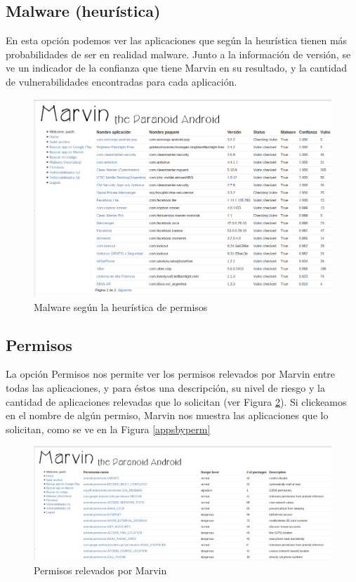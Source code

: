 \documentclass[11pt]{article}
\begin{document}
\subsection{Malware (heurística)}
En esta opción podemos ver las aplicaciones que según la heurística tienen más probabilidades de ser en realidad malware. Junto a la información de versión, se ve un indicador de la confianza que tiene Marvin en su resultado, y la cantidad de vulnerabilidades encontradas para cada aplicación.
\begin{figure}[H]
\begin{center}
\includegraphics[width=\textwidth]{graphics/marvin_bayesboys.png}
\caption{Malware según la heurística de permisos} \label{bayes}
\end{center}
\end{figure}
\subsection{Permisos}\label{permisos}
La opción Permisos nos permite ver los permisos relevados por Marvin entre todas las aplicaciones, y para éstos una descripción, su nivel de riesgo y la cantidad de aplicaciones relevadas que lo solicitan (ver Figura \ref{perms}). Si clickeamos en el nombre de algún permiso, Marvin nos muestra las aplicaciones que lo solicitan, como se ve en la Figura \ref{appsbyperm}
\begin{figure}[H]
\begin{center}
\includegraphics[width=\textwidth]{graphics/marvin_permissions.png}
\caption{Permisos relevados por Marvin} \label{perms}
\end{center}
\end{figure}
\end{document}
